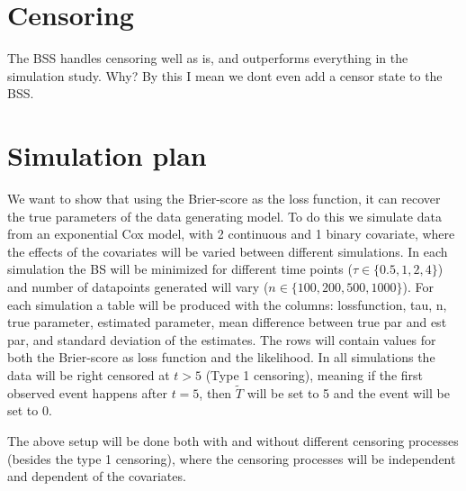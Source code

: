 \documentclass{article}
\begin{document}
\section*{Censoring}
\label{sec:orgc85fa83}
The BSS handles censoring well as is, and outperforms everything in the simulation study. Why? By this I mean we dont even add a censor state to the BSS.


\section*{Simulation plan}
\label{sec:org99826ee}

We want to show that using the Brier-score as the loss function, it can recover the true parameters of the data generating model. To do this we simulate data from an exponential Cox model, with 2 continuous and 1 binary covariate, where the effects of the covariates will be varied between different simulations. In each simulation the BS will be minimized for different time points (\(\tau\in\{0.5,1,2,4\}\)) and number of datapoints generated will vary (\(n\in\{100,200,500,1000\}\)). For each simulation a table will be produced with the columns: lossfunction, tau, n, true parameter, estimated parameter, mean difference between true par and est par, and standard deviation of the estimates. The rows will contain values for both the Brier-score as loss function and the likelihood. In all simulations the data will be right censored at \(t>5\) (Type 1 censoring), meaning if the first observed event happens after \(t = 5\), then \(\tilde{T}\) will be set to 5 and the event will be set to 0.

The above setup will be done both with and without different censoring processes (besides the type 1 censoring), where the censoring processes will be independent and dependent of the covariates.
\end{document}
